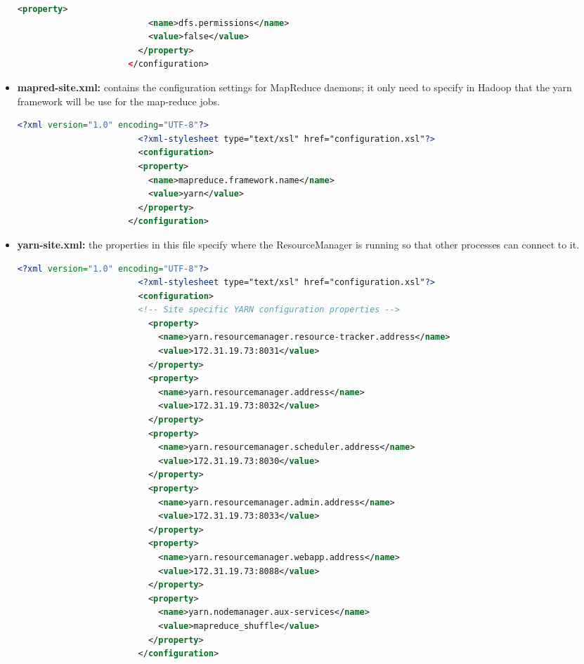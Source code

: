 \documentclass{article}
\begin{document}
\begin{itemize}
\begin{lstlisting}[language=XML, caption= hdfs-site.xml, label={lst:hdfs}]
                        <property>
                          <name>dfs.permissions</name>
                          <value>false</value>
                        </property>
                      </configuration>
                    \end{lstlisting}
                \item \textbf{mapred-site.xml:} contains the configuration settings for MapReduce daemons; it only need to specify in Hadoop that the yarn framework will be use for the map‐reduce jobs.
                    \begin{lstlisting}[language=XML, caption= mapred-site.xml, label={lst:mapred}]
                        <?xml version="1.0" encoding="UTF-8"?>
                        <?xml-stylesheet type="text/xsl" href="configuration.xsl"?>
                        <configuration>
                        <property>
                          <name>mapreduce.framework.name</name>
                          <value>yarn</value>
                        </property>
                      </configuration>                      
                \end{lstlisting}
                \item \textbf{yarn-site.xml:} the properties in this file specify where the ResourceManager is running so that other processes can connect to it.
                    \begin{lstlisting}[language=XML, caption= yarn-site.xml, label={lst:yarn}]
                        <?xml version="1.0" encoding="UTF-8"?>
                        <?xml-stylesheet type="text/xsl" href="configuration.xsl"?>
                        <configuration>
                        <!-- Site specific YARN configuration properties -->
                          <property>
                            <name>yarn.resourcemanager.resource-tracker.address</name>
                            <value>172.31.19.73:8031</value>
                          </property>
                          <property>
                            <name>yarn.resourcemanager.address</name>
                            <value>172.31.19.73:8032</value>
                          </property>
                          <property>
                            <name>yarn.resourcemanager.scheduler.address</name>
                            <value>172.31.19.73:8030</value>
                          </property>
                          <property>
                            <name>yarn.resourcemanager.admin.address</name>
                            <value>172.31.19.73:8033</value>
                          </property>
                          <property>
                            <name>yarn.resourcemanager.webapp.address</name>
                            <value>172.31.19.73:8088</value>
                          </property>
                          <property>
                            <name>yarn.nodemanager.aux‐services</name>
                            <value>mapreduce_shuffle</value>
                          </property>
                        </configuration>                     
                \end{lstlisting}
            \end{itemize}
\end{document}
